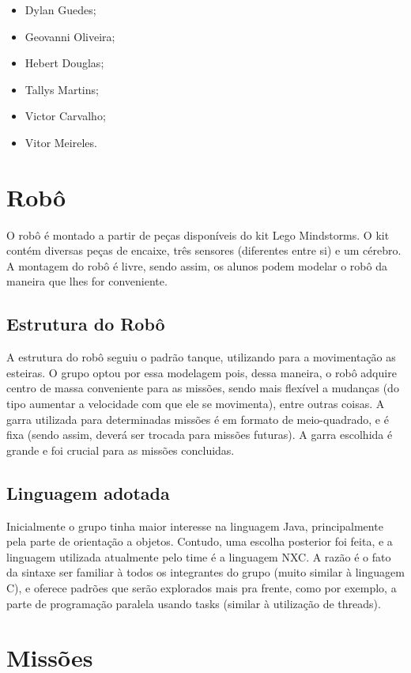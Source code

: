\begin{itemize}
\item Dylan Guedes;
\item Geovanni Oliveira;
\item Hebert Douglas;
\item Tallys Martins;
\item Victor Carvalho;
\item Vitor Meireles.
\end{itemize}

\chapter{Robô}
O robô é montado a partir de peças disponíveis do kit Lego Mindstorms. O kit contém diversas peças de encaixe, três sensores (diferentes entre si) e um cérebro. A montagem do robô é livre, sendo assim, os alunos podem modelar o robô da maneira que lhes for conveniente.

\section{Estrutura do Robô}
A estrutura do robô seguiu o padrão tanque, utilizando para a movimentação as esteiras. O grupo optou por essa modelagem pois, dessa maneira, o robô adquire centro de massa conveniente para as missões, sendo mais flexível a mudanças (do tipo aumentar a velocidade com que ele se movimenta), entre outras coisas. A garra utilizada para determinadas missões é em formato de meio-quadrado, e é fixa (sendo assim, deverá ser trocada para missões futuras). A garra escolhida é grande e foi crucial para as missões concluidas.

\section{Linguagem adotada}
Inicialmente o grupo tinha maior interesse na linguagem Java, principalmente pela parte de orientação a objetos. Contudo, uma escolha posterior foi feita, e a linguagem utilizada atualmente pelo time é a linguagem NXC. A razão é o fato da sintaxe ser familiar à todos os integrantes do grupo (muito similar à linguagem C), e oferece padrões que serão explorados mais pra frente, como por exemplo, a parte de programação paralela usando tasks (similar à utilização de threads).

\chapter{Missões}
